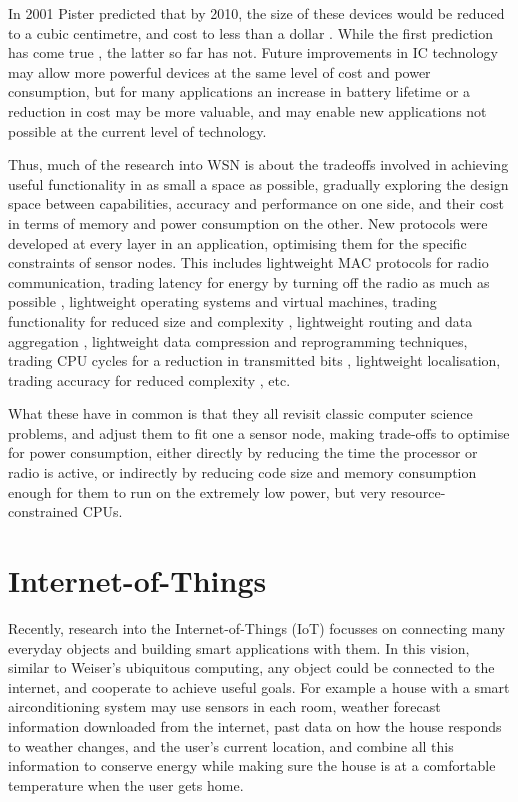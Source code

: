 In 2001 Pister predicted that by 2010, the size of these devices would be reduced to a cubic centimetre, and cost to less than a dollar \cite{Pister:2001vr}. While the first prediction has come true \cite{Wang:2014cq}, the latter so far has not. Future improvements in IC technology may allow more powerful devices at the same level of cost and power consumption, but for many applications an increase in battery lifetime or a reduction in cost may be more valuable, and may enable new applications not possible at the current level of technology.

Thus, much of the research into WSN is about the tradeoffs involved in achieving useful functionality in as small a space as possible, gradually exploring the design space between capabilities, accuracy and performance on one side, and their cost in terms of memory and power consumption on the other. New protocols were developed at every layer in an application, optimising them for the specific constraints of sensor nodes. This includes lightweight MAC protocols for radio communication, trading latency for energy by turning off the radio as much as possible \cite{Ye:2002uv, vanDam:2018tr}, lightweight operating systems and virtual machines, trading functionality for reduced size and complexity \cite{Levis:2004ws, Gu:2006ww, Han:2005th, Levis:2002ku, Brouwers:2009cj}, lightweight routing and data aggregation \cite{Intanogonwiwat:2018wz, Braginsky:2002wg}, lightweight data compression and reprogramming techniques, trading CPU cycles for a reduction in transmitted bits \cite{Marcelloni:2009ja, Reijers:2003ww}, lightweight localisation, trading accuracy for reduced complexity \cite{Niculescu:2001bl, Savarese:2002tx, Savvides:2002uf}, etc.

What these have in common is that they all revisit classic computer science problems, and adjust them to fit one a sensor node, making trade-offs to optimise for power consumption, either directly by reducing the time the processor or radio is active, or indirectly by reducing code size and memory consumption enough for them to run on the extremely low power, but very resource-constrained CPUs.

\section{Internet-of-Things}
\label{sec-introduction-iot}
Recently, research into the Internet-of-Things (IoT) focusses on connecting many everyday objects and building smart applications with them. In this vision, similar to Weiser's ubiquitous computing, any object could be connected to the internet, and cooperate to achieve useful goals. For example a house with a smart airconditioning system may use sensors in each room, weather forecast information downloaded from the internet, past data on how the house responds to weather changes, and the user's current location, and combine all this information to conserve energy while making sure the house is at a comfortable temperature when the user gets home.

